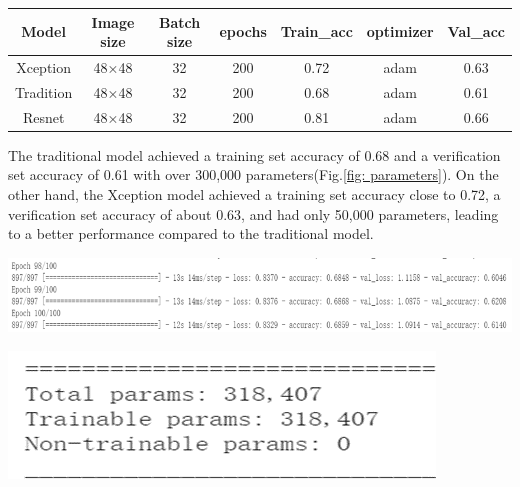\documentclass[a0,portrait]{a0poster}
\begin{document}
\begin{multicols}{2}
\begin{center}
\begin{tabular}{ccccccc}
		\toprule %
		
		
		
		\textbf{Model} & \textbf{Image size} & \textbf{Batch size} & \textbf{epochs} & \textbf{Train\_acc}  & \textbf{optimizer} &  \textbf{Val\_acc}\\
		
		\hline
		
		Xception & 48×48 & 32 & 200 & 0.72 & adam & 0.63 \\
		Tradition& 48×48 & 32 & 200 & 0.68 & adam & 0.61 \\
		Resnet   & 48×48 & 32 & 200	& 0.81 & adam & 0.66 \\
		
		\bottomrule
		
	\end{tabular}
\end{center}\vspace{1cm}

The traditional model achieved a training set accuracy of 0.68 and a verification set accuracy of 0.61 with over 300,000 parameters(Fig.\ref{fig: parameters}). On the other hand, the Xception model achieved a training set accuracy close to 0.72, a verification set accuracy of about 0.63, and had only 50,000 parameters, leading to a better performance compared to the traditional model.

\begin{center}\vspace{1cm}
	\includegraphics[width=0.8\linewidth]{training_results}
\end{center}\vspace{1cm}

\begin{center}\vspace{1cm}
	\includegraphics[width=0.5\linewidth]{parameters}
\end{center}\vspace{1cm}


\end{multicols}
\end{document}
